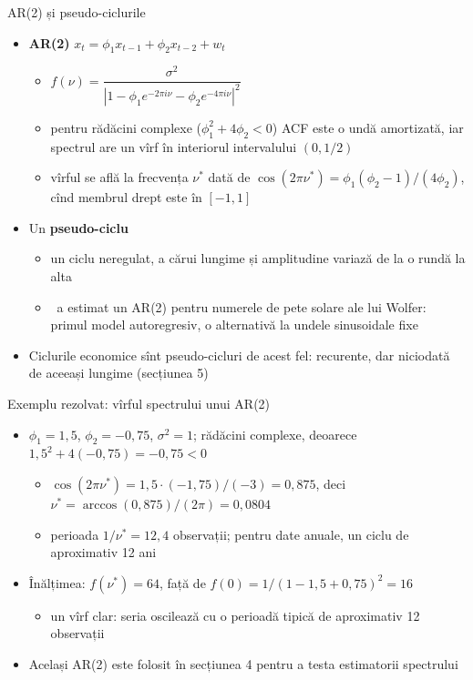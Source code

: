 \begin{frame}{AR(2) și pseudo-ciclurile}
\itemsize{\small}
\begin{itemize}
    \item \textbf{AR(2)} $x_t = \phi_1 x_{t-1} + \phi_2 x_{t-2} + w_t$
    \begin{itemize}
        \item $f(\nu) = \dfrac{\sigma^2}{|1 - \phi_1 e^{-2\pi i\nu} - \phi_2 e^{-4\pi i\nu}|^2}$
        \item pentru rădăcini complexe ($\phi_1^2 + 4\phi_2 < 0$) ACF este o undă amortizată, iar spectrul are un vîrf în interiorul intervalului $(0, 1/2)$
        \item vîrful se află la frecvența $\nu^*$ dată de $\cos(2\pi\nu^*) = \phi_1(\phi_2 - 1)/(4\phi_2)$, cînd membrul drept este în $[-1, 1]$
    \end{itemize}
    \item Un \textbf{pseudo-ciclu}
    \begin{itemize}
        \item un ciclu neregulat, a cărui lungime și amplitudine variază de la o rundă la alta
        \item {}\ a estimat un AR(2) pentru numerele de pete solare ale lui Wolfer: primul model autoregresiv, o alternativă la undele sinusoidale fixe
    \end{itemize}
    \item Ciclurile economice sînt pseudo-cicluri de acest fel: recurente, dar niciodată de aceeași lungime (secțiunea 5)
\end{itemize}
\end{frame}

\begin{frame}{Exemplu rezolvat: vîrful spectrului unui AR(2)}
\itemsize{\small}
\begin{itemize}
    \item $\phi_1 = 1{,}5$, $\phi_2 = -0{,}75$, $\sigma^2 = 1$; rădăcini complexe, deoarece $1{,}5^2 + 4(-0{,}75) = -0{,}75 < 0$
    \begin{itemize}
        \item $\cos(2\pi\nu^*) = 1{,}5 \cdot (-1{,}75)/(-3) = 0{,}875$, deci $\nu^* = \arccos(0{,}875)/(2\pi) = 0{,}0804$
        \item perioada $1/\nu^* = 12{,}4$ observații; pentru date anuale, un ciclu de aproximativ 12 ani
    \end{itemize}
    \item Înălțimea: $f(\nu^*) = 64$, față de $f(0) = 1/(1 - 1{,}5 + 0{,}75)^2 = 16$
    \begin{itemize}
        \item un vîrf clar: seria oscilează cu o perioadă tipică de aproximativ 12 observații
    \end{itemize}
    \item Același AR(2) este folosit în secțiunea 4 pentru a testa estimatorii spectrului
\end{itemize}
\end{frame}

